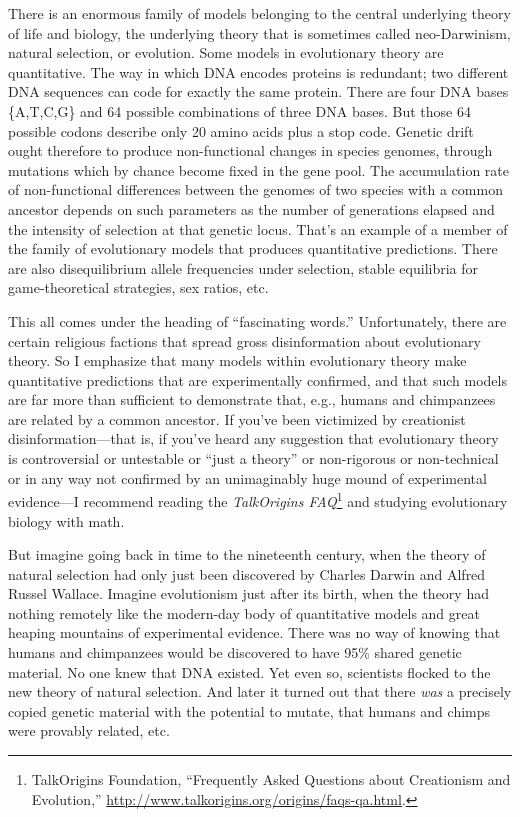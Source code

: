 {
 There is an enormous family of models belonging to the central
underlying theory of life and biology, the underlying theory that is
sometimes called neo-Darwinism, natural selection, or evolution. Some
models in evolutionary theory are quantitative. The way in which DNA
encodes proteins is redundant; two different DNA sequences can code for
exactly the same protein. There are four DNA bases
\{A,T,C,G\}
and 64 possible combinations of three DNA bases. But those 64 possible
codons describe only 20 amino acids plus a stop code. Genetic drift
ought therefore to produce non-functional changes in species genomes,
through mutations which by chance become fixed in the gene pool. The
accumulation rate of non-functional differences between the genomes of
two species with a common ancestor depends on such parameters as the
number of generations elapsed and the intensity of selection at that
genetic locus. That's an example of a member of the
family of evolutionary models that produces quantitative predictions.
There are also disequilibrium allele frequencies under selection,
stable equilibria for game-theoretical strategies, sex ratios, etc.}

{
 This all comes under the heading of ``fascinating
words.'' Unfortunately, there are certain religious
factions that spread gross disinformation about evolutionary theory. So
I emphasize that many models within evolutionary theory make
quantitative predictions that are experimentally confirmed, and that
such models are far more than sufficient to demonstrate that, e.g.,
humans and chimpanzees are related by a common ancestor. If
you've been victimized by creationist
disinformation---that is, if you've heard any
suggestion that evolutionary theory is controversial or untestable or
``just a theory'' or non-rigorous or
non-technical or in any way not confirmed by an unimaginably huge mound
of experimental evidence---I recommend reading the \textit{TalkOrigins
FAQ}\footnote{TalkOrigins Foundation, ``Frequently Asked
Questions about Creationism and Evolution,''
\url{http://www.talkorigins.org/origins/faqs-qa.html}.} and studying evolutionary biology with math.}

{
 But imagine going back in time to the nineteenth century, when the
theory of natural selection had only just been discovered by Charles
Darwin and Alfred Russel Wallace. Imagine evolutionism just after its
birth, when the theory had nothing remotely like the modern-day body of
quantitative models and great heaping mountains of experimental
evidence. There was no way of knowing that humans and chimpanzees would
be discovered to have 95\% shared genetic material. No one knew that
DNA existed. Yet even so, scientists flocked to the new theory of
natural selection. And later it turned out that there \textit{was} a
precisely copied genetic material with the potential to mutate, that
humans and chimps were provably related, etc.}

